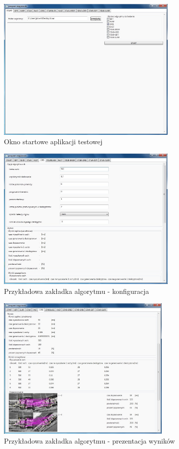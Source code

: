 \documentclass[oneside]{mgr}
\begin{document}
\begin{figure}
\centering
\includegraphics[height=7cm]{pict/podsumowanie/1.jpg}
\caption{Okno startowe aplikacji testowej}
\label{pict:a1}
\end{figure}

\begin{figure}
\centering
\includegraphics[height=7cm]{pict/podsumowanie/3.jpg}
\caption{Przykładowa zakładka algorytmu - konfiguracja}
\label{pict:a2}
\end{figure}

\begin{figure}
\centering
\includegraphics[height=7cm]{pict/podsumowanie/2.jpg}
\caption{Przykładowa zakładka algorytmu - prezentacja wyników}
\label{pict:a3}
\end{figure}
\end{document}
